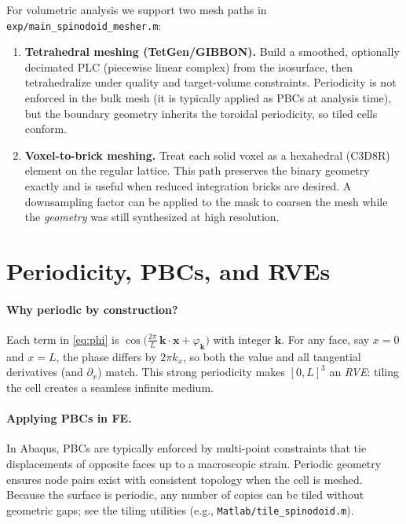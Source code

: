 \documentclass[11pt,a4paper]{article}
\newcommand{\vx}{\bm{x}}
\newcommand{\vk}{\bm{k}}
\begin{document}
For volumetric analysis we support two mesh paths in \texttt{exp/main\_spinodoid\_mesher.m}:
\begin{enumerate}[label=\arabic*)]
  \item \textbf{Tetrahedral meshing (TetGen/GIBBON).} Build a smoothed, optionally decimated PLC (piecewise linear complex) from the isosurface, then tetrahedralize under quality and target-volume constraints. Periodicity is not enforced in the bulk mesh (it is typically applied as PBCs at analysis time), but the boundary geometry inherits the toroidal periodicity, so tiled cells conform.
  \item \textbf{Voxel-to-brick meshing.} Treat each solid voxel as a hexahedral (C3D8R) element on the regular lattice. This path preserves the binary geometry exactly and is useful when reduced integration bricks are desired. A downsampling factor can be applied to the mask to coarsen the mesh while the \emph{geometry} was still synthesized at high resolution.
\end{enumerate}

\section{Periodicity, PBCs, and RVEs}
\paragraph{Why periodic by construction?} Each term in \eqref{eq:phi} is $\cos\big(\tfrac{2\pi}{L}\,\vk\cdot\vx+\varphi_{\vk}\big)$ with integer $\vk$. For any face, say $x=0$ and $x=L$, the phase differs by $2\pi k_x$, so both the value and all tangential derivatives (and $\partial_x$) match. This strong periodicity makes $[0,L]^3$ an \emph{RVE}: tiling the cell creates a seamless infinite medium.

\paragraph{Applying PBCs in FE.} In Abaqus, PBCs are typically enforced by multi-point constraints that tie displacements of opposite faces up to a macroscopic strain. Periodic geometry ensures node pairs exist with consistent topology when the cell is meshed. Because the surface is periodic, any number of copies can be tiled without geometric gaps; see the tiling utilities (e.g., \texttt{Matlab/tile\_spinodoid.m}).
\end{document}
